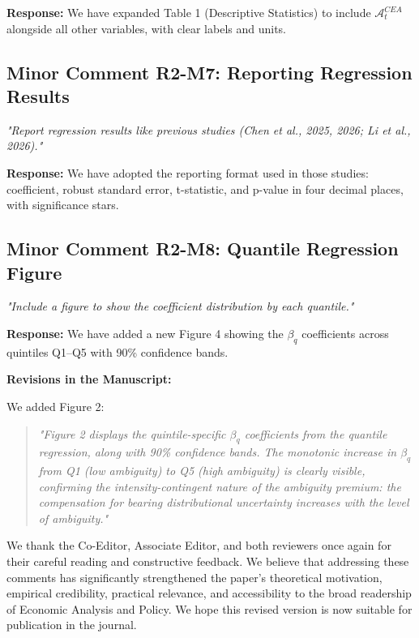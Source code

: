\documentclass[12pt]{article}
\begin{document}
\begin{highlightbox}
\textbf{Response:} We have expanded Table 1 (Descriptive Statistics) to include $\mathcal{A}^{CEA}_t$ alongside all other variables, with clear labels and units.
\end{highlightbox}

\subsection*{Minor Comment R2-M7: Reporting Regression Results}
\textit{"Report regression results like previous studies (Chen et al., 2025, 2026; Li et al., 2026)."}

\begin{highlightbox}
\textbf{Response:} We have adopted the reporting format used in those studies: coefficient, robust standard error, t-statistic, and p-value in four decimal places, with significance stars.
\end{highlightbox}

\subsection*{Minor Comment R2-M8: Quantile Regression Figure}
\textit{"Include a figure to show the coefficient distribution by each quantile."}

\begin{highlightbox}
\textbf{Response:} We have added a new Figure 4 showing the $\beta_q$ coefficients across quintiles Q1--Q5 with 90\% confidence bands.
\end{highlightbox}

\begin{highlightbox}
\textbf{Revisions in the Manuscript:}

We added Figure 2:
\vspace{0.2cm}
\begin{quote}
\itshape "Figure 2 displays the quintile-specific $\beta_q$ coefficients from the quantile regression, along with 90\% confidence bands. The monotonic increase in $\beta_q$ from Q1 (low ambiguity) to Q5 (high ambiguity) is clearly visible, confirming the intensity-contingent nature of the ambiguity premium: the compensation for bearing distributional uncertainty increases with the level of ambiguity."
\end{quote}
\end{highlightbox}

\vspace{0.5cm}
We thank the Co-Editor, Associate Editor, and both reviewers once again for their careful reading and constructive feedback. We believe that addressing these comments has significantly strengthened the paper's theoretical motivation, empirical credibility, practical relevance, and accessibility to the broad readership of Economic Analysis and Policy. We hope this revised version is now suitable for publication in the journal.



\end{document}
